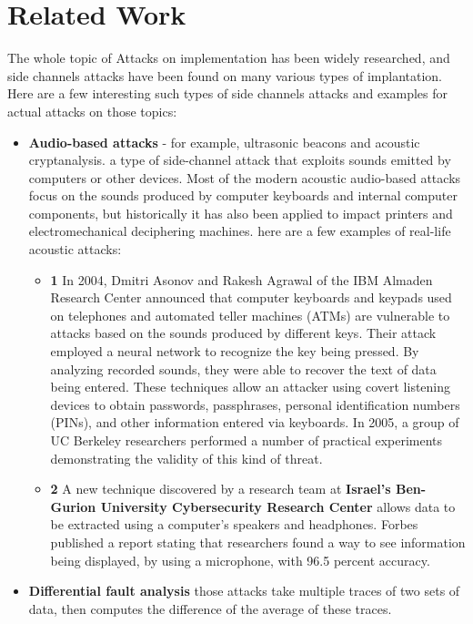 \section{Related Work} \label{sec:RelatedWork}
The whole topic of Attacks on implementation has been widely researched,
and side channels attacks have been found on many various types of implantation.
Here are a few interesting such types of side channels attacks
 and examples for actual attacks on those topics:
\begin{itemize}
    \item \textbf{Audio-based attacks} - for example, ultrasonic beacons and acoustic cryptanalysis. 
    a type of side-channel attack that exploits sounds emitted by computers or other devices.
    Most of the modern acoustic audio-based attacks focus on the sounds produced by computer keyboards and internal computer components,
    but historically it has also been applied to impact printers and electromechanical deciphering machines.
    here are a few examples of real-life acoustic attacks: 
    \begin{itemize}
        \item \textbf{1} In 2004, Dmitri Asonov and Rakesh Agrawal of the IBM Almaden Research Center announced that computer keyboards and keypads used on telephones and automated teller machines (ATMs) are vulnerable to attacks based on the sounds produced by different keys.
         Their attack employed a neural network to recognize the key being pressed.
         By analyzing recorded sounds, they were able to recover the text of data being entered.
         These techniques allow an attacker using covert listening devices to obtain passwords, passphrases, personal identification numbers (PINs), and other information entered via keyboards.
         In 2005, a group of UC Berkeley researchers performed a number of practical experiments demonstrating the validity of this kind of threat.
        \item \textbf{2} A new technique discovered by a research team at \textbf{Israel's Ben-Gurion University Cybersecurity Research Center} 
        allows data to be extracted using a computer's speakers and headphones. 
        Forbes published a report stating that researchers found a way to see information being displayed, by using a microphone, with 96.5 percent accuracy.
    \end{itemize}
    \item \textbf{Differential fault analysis} those attacks take multiple traces of two sets of data, then computes the difference of the average of these traces.

\end{itemize}

